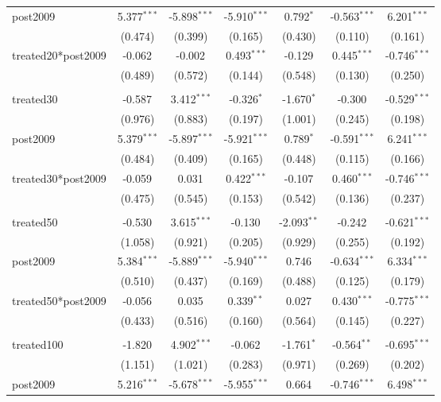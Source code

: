 \documentclass[12pt]{article}
\begin{document}
\begin{table}[!htbp]
\begin{tabular}{@{\extracolsep{5pt}}lcccccc}
 post2009 & 5.377$^{***}$ & -5.898$^{***}$ & -5.910$^{***}$ & 0.792$^{*}$ & -0.563$^{***}$ & 6.201$^{***}$ \\
  & (0.474) & (0.399) & (0.165) & (0.430) & (0.110) & (0.161) \\
 treated20*post2009 & -0.062$^{}$ & -0.002$^{}$ & 0.493$^{***}$ & -0.129$^{}$ & 0.445$^{***}$ & -0.746$^{***}$ \\
  & (0.489) & (0.572) & (0.144) & (0.548) & (0.130) & (0.250) \\
\hline \\[-1.8ex]
 treated30 & -0.587$^{}$ & 3.412$^{***}$ & -0.326$^{*}$ & -1.670$^{*}$ & -0.300$^{}$ & -0.529$^{***}$ \\
  & (0.976) & (0.883) & (0.197) & (1.001) & (0.245) & (0.198) \\
 post2009 & 5.379$^{***}$ & -5.897$^{***}$ & -5.921$^{***}$ & 0.789$^{*}$ & -0.591$^{***}$ & 6.241$^{***}$ \\
  & (0.484) & (0.409) & (0.165) & (0.448) & (0.115) & (0.166) \\
 treated30*post2009 & -0.059$^{}$ & 0.031$^{}$ & 0.422$^{***}$ & -0.107$^{}$ & 0.460$^{***}$ & -0.746$^{***}$ \\
  & (0.475) & (0.545) & (0.153) & (0.542) & (0.136) & (0.237) \\
\hline \\[-1.8ex]
 treated50 & -0.530$^{}$ & 3.615$^{***}$ & -0.130$^{}$ & -2.093$^{**}$ & -0.242$^{}$ & -0.621$^{***}$ \\
  & (1.058) & (0.921) & (0.205) & (0.929) & (0.255) & (0.192) \\
 post2009 & 5.384$^{***}$ & -5.889$^{***}$ & -5.940$^{***}$ & 0.746$^{}$ & -0.634$^{***}$ & 6.334$^{***}$ \\
  & (0.510) & (0.437) & (0.169) & (0.488) & (0.125) & (0.179) \\
 treated50*post2009 & -0.056$^{}$ & 0.035$^{}$ & 0.339$^{**}$ & 0.027$^{}$ & 0.430$^{***}$ & -0.775$^{***}$ \\
  & (0.433) & (0.516) & (0.160) & (0.564) & (0.145) & (0.227) \\
\hline \\[-1.8ex]
 treated100 & -1.820$^{}$ & 4.902$^{***}$ & -0.062$^{}$ & -1.761$^{*}$ & -0.564$^{**}$ & -0.695$^{***}$ \\
  & (1.151) & (1.021) & (0.283) & (0.971) & (0.269) & (0.202) \\
 post2009 & 5.216$^{***}$ & -5.678$^{***}$ & -5.955$^{***}$ & 0.664$^{}$ & -0.746$^{***}$ & 6.498$^{***}$ \\

\end{tabular}
\end{table}
\end{document}
